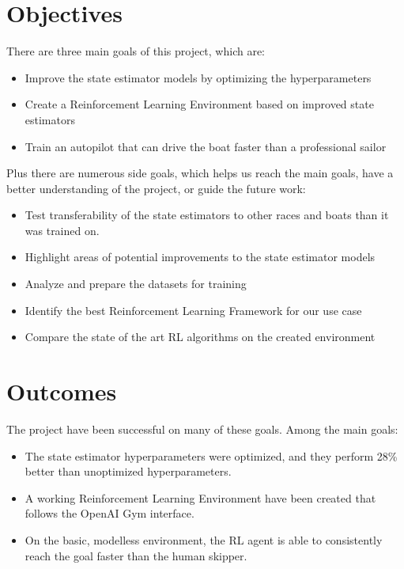 \documentclass[12pt,twoside]{report}
\begin{document}
\section{Objectives}
There are three main goals of this project, which are:
\begin{itemize}
    \item Improve the state estimator models by optimizing the hyperparameters
    \item Create a Reinforcement Learning Environment based on improved state estimators
    \item Train an autopilot that can drive the boat faster than a professional sailor
\end{itemize}

\bigskip
\noindent    
Plus there are numerous side goals, which helps us reach the main goals, have a better understanding of the project, or guide the future work:
\begin{itemize}
    \item Test transferability of the state estimators to other races and boats than it was trained on.
    \item Highlight areas of potential improvements to the state estimator models
    \item Analyze and prepare the datasets for training
    \item Identify the best Reinforcement Learning Framework for our use case
    \item Compare the state of the art RL algorithms on the created environment
\end{itemize}
    

\section{Outcomes} \label{sec:outcomes}
The project have been successful on many of these goals. Among the main goals:
\begin{itemize}
    \item The state estimator hyperparameters were optimized, and they perform 28\% better than unoptimized hyperparameters.
    \item A working Reinforcement Learning Environment have been created that follows the OpenAI Gym interface.
    \item On the basic, modelless environment, the RL agent is able to consistently reach the goal faster than the human skipper.
\end{itemize}
\end{document}
